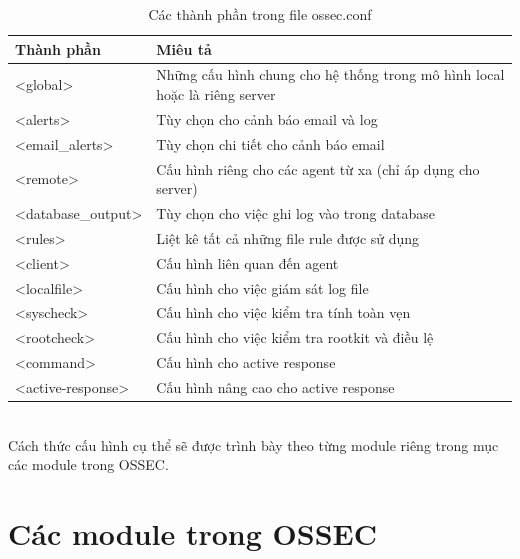 \begin{table}[h!]
  	 	\centering
		\begin{tabular}{|p{4cm}|p{9cm}|}
		\hline
		\textbf{Thành phần} & \textbf{Miêu tả}\\
		 \hline
		 \textless global\textgreater & Những cấu hình chung cho hệ thống trong mô
		 hình local hoặc là riêng server\\
		 \hline
		 \textless alerts\textgreater & Tùy chọn cho cảnh báo email và log\\
		 \hline
		 \textless email\_alerts\textgreater & Tùy chọn chi tiết cho cảnh báo email\\
		 \hline
		 \textless remote\textgreater & Cấu hình riêng cho các agent từ xa (chỉ áp
		 dụng cho server)\\
		 \hline
		 \textless database\_output\textgreater & Tùy chọn cho việc ghi log vào trong
		 database\\
		 \hline
		 \textless rules\textgreater & Liệt kê tất cả những file rule được sử dụng\\
		 \hline
		 \textless client\textgreater & Cấu hình liên quan đến agent\\
		 \hline
		 \textless localfile\textgreater & Cấu hình cho việc giám sát log file\\
		 \hline
		 \textless syscheck\textgreater & Cấu hình cho việc kiểm tra tính toàn vẹn\\
		 \hline
		 \textless rootcheck\textgreater & Cấu hình cho việc kiểm tra rootkit và điều
		 lệ\\
		 \hline
		 \textless command\textgreater & Cấu hình cho active response\\
		 \hline
		 \textless active-response\textgreater & Cấu hình nâng cao cho active
		 response\\
		 \hline
		 \end{tabular}
		 \caption{Các thành phần trong file ossec.conf}
\end{table}\\
  Cách thức cấu hình cụ thể sẽ được trình bày theo từng module riêng trong
mục các module trong OSSEC.
\section{Các module trong OSSEC}
